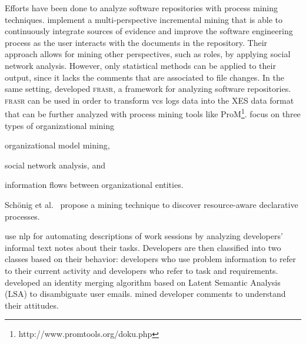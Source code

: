 Efforts have been done to analyze software repositories with process mining techniques. \cite{rubin2007process} implement a multi-perspective incremental mining that is able to continuously integrate sources of evidence and improve the software engineering process as the user interacts with the documents in the repository. Their approach allows for mining other perspectives, such as roles, by applying social network analysis. However, only statistical methods can be applied to their output, since it lacks the comments that are associated to file changes. In the same setting, \cite{Poncin2011} developed \textsc{frasr}, a framework for analyzing software repositories. \textsc{frasr} can be used in order to transform \gls*{vcs} logs data into the XES \citep{verbeek2010xes} data format that can be further analyzed with process mining tools like ProM\footnote{http://www.promtools.org/doku.php}. 
\cite{Song2008} focus on three types of organizational mining 
\begin{inparaenum}[\itshape i)]
   \item organizational model mining, 
   \item social network analysis, and 
   \item information flows between organizational entities.
\end{inparaenum} Schönig et al.~\cite{Schonig2015} propose a mining technique to discover resource-aware declarative processes.

\cite{Maalej2010} use \gls*{nlp} for automating descriptions of work sessions by analyzing developers' informal text notes about their tasks. Developers are then classified into two classes based on their behavior: developers who use problem information to refer to their current activity and developers who refer to task and requirements. \cite{Kouters2012} developed an identity merging algorithm based on Latent Semantic Analysis (LSA) to disambiguate user emails. \cite{Licorish2014} mined developer comments to understand their attitudes.

